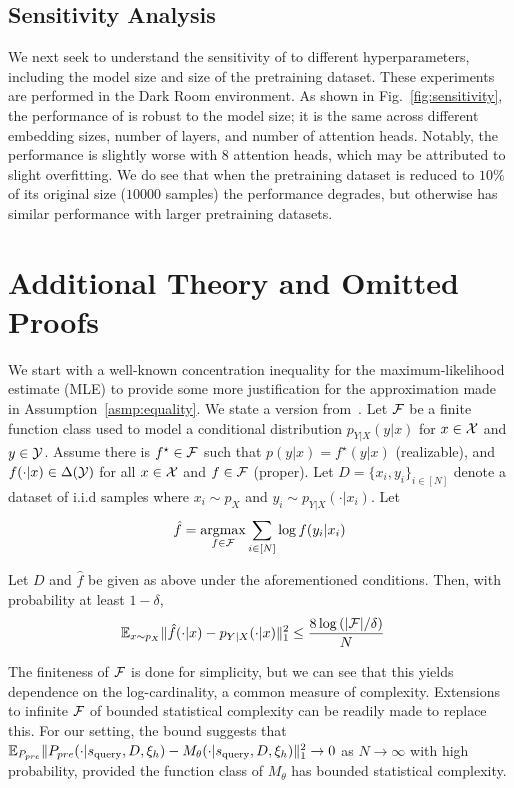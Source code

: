 \subsection{Sensitivity Analysis}
We next seek to understand the sensitivity of \macroName{} to different hyperparameters, including the model size and size of the pretraining dataset. These experiments are performed in the Dark Room environment. As shown in Fig.~\ref{fig:sensitivity}, the performance of \macroName{} is robust to the model size; it is the same across different embedding sizes, number of layers, and number of attention heads. Notably, the performance is slightly worse with $8$ attention heads, which may be attributed to slight overfitting. We do see that when the pretraining dataset is reduced to $10\%$ of its original size ($10000$ samples) the performance degrades, but otherwise has similar performance with larger pretraining datasets.








\section{Additional Theory and Omitted Proofs}\label{app:theory}


We start with a well-known concentration inequality for the maximum-likelihood estimate (MLE) to provide some more justification for the approximation made in Assumption~\ref{asmp:equality}. We state a version from~\cite{agarwal2020flambe}.
Let $\mathcal{F}$ be a finite function class used to model a conditional distribution $p_{Y| X} (y | x)$ for $x \in \mathcal{X}$ and $y \in \mathcal{Y}$. Assume there is $f^\star \in \mathcal{F}$ such that $p(y | x) = f^\star(y | x)$ (realizable), and $f(\cdot| x) \in \Delta(\mathcal{Y})$ for all $x \in \mathcal{X}$ and $f \in \mathcal{F}$ (proper). Let $D = \{ x_i, y_i\}_{i \in [N]}$ denote a dataset of i.i.d samples where $x_i \sim p_X$ and $y_i \sim p_{Y | X} (\cdot | x_i)$.
Let
\begin{align}
    \hat f = \mathop{\mathrm{argmax}}_{f \in \mathcal{F}}  \sum_{i \in [N]} \log f(y_i | x_i) 
\end{align}
\begin{proposition}\label{prop:mle}
Let $D$ and $\hat f$ be given as above under the aforementioned conditions. Then, with probability at least $1 - \delta$, 
\begin{align}
    \mathbb{E}_{x \sim p_X}  \| \hat f(\cdot | x) - p_{Y| X}(\cdot | x) \|_1^2 & \leq \frac{8 \log \left( |\mathcal{F}| /\delta \right) }{N}
\end{align}
\end{proposition}
The finiteness of $\mathcal{F}$ is done for simplicity, but we can see that this yields dependence on the log-cardinality,  a common measure of complexity. Extensions to infinite $\mathcal{F}$ of bounded statistical complexity can be readily made to replace this.
For our setting, the bound suggests that $\mathbb{E}_{P_{pre}} \| P_{pre}(\cdot | s_{\text{query}}, D, \xi_h) - M_{\theta} (\cdot | s_{\text{query}}, D, \xi_h) \|_1^2 \rightarrow 0$ as $N \rightarrow \infty$ with high probability, provided the function class of $M_{\theta}$ has bounded statistical complexity.

